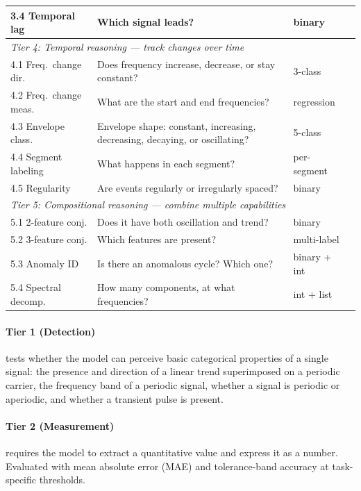 \documentclass[11pt]{article}
\begin{document}
\begin{table}[t]
\begin{tabular}{llll}
3.4 Temporal lag       & Which signal leads?                        & binary \\
\midrule
\multicolumn{3}{l}{\emph{Tier 4: Temporal reasoning --- track changes over time}} \\
4.1 Freq.\ change dir. & Does frequency increase, decrease, or stay constant? & 3-class \\
4.2 Freq.\ change meas.& What are the start and end frequencies?    & regression \\
4.3 Envelope class.    & Envelope shape: constant, increasing, decreasing, decaying, or oscillating? & 5-class \\
4.4 Segment labeling   & What happens in each segment?              & per-segment \\
4.5 Regularity         & Are events regularly or irregularly spaced?& binary \\
\midrule
\multicolumn{3}{l}{\emph{Tier 5: Compositional reasoning --- combine multiple capabilities}} \\
5.1 2-feature conj.    & Does it have both oscillation and trend?   & binary \\
5.2 3-feature conj.    & Which features are present?                & multi-label \\
5.3 Anomaly ID         & Is there an anomalous cycle? Which one?    & binary + int \\
5.4 Spectral decomp.   & How many components, at what frequencies?  & int + list \\
\bottomrule
\end{tabular}
\end{table}

\paragraph{Tier 1 (Detection)} tests whether the model can perceive basic categorical properties of a single signal: the presence and direction of a linear trend superimposed on a periodic carrier, the frequency band of a periodic signal, whether a signal is periodic or aperiodic, and whether a transient pulse is present.

\paragraph{Tier 2 (Measurement)} requires the model to extract a quantitative value and express it as a number. Evaluated with mean absolute error (MAE) and tolerance-band accuracy at task-specific thresholds.
\end{document}
